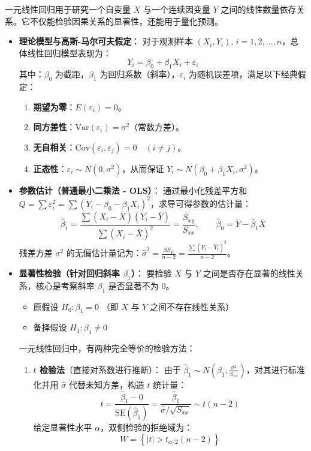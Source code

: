 \documentclass[a4paper]{ctexart}
\begin{document}
一元线性回归用于研究一个自变量 $X$ 与一个连续因变量 $Y$ 之间的线性数量依存关系。它不仅能检验因果关系的显著性，还能用于量化预测。

\begin{itemize}
    \item \textbf{理论模型与高斯-马尔可夫假定}：
    对于观测样本 $(X_i, Y_i), \, i=1,2,\dots,n$，总体线性回归模型表现为：
    \[ Y_i = \beta_0 + \beta_1 X_i + \varepsilon_i \]
    其中：$\beta_0$ 为截距，$\beta_1$ 为回归系数（斜率），$\varepsilon_i$ 为随机误差项，满足以下经典假定：
    \begin{enumerate}
        \item \textbf{期望为零}：$E(\varepsilon_i) = 0$。
        \item \textbf{同方差性}：$\text{Var}(\varepsilon_i) = \sigma^2$（常数方差）。
        \item \textbf{无自相关}：$\text{Cov}(\varepsilon_i, \varepsilon_j) = 0 \quad (i \neq j)$。
        \item \textbf{正态性}：$\varepsilon_i \sim N(0, \sigma^2)$，从而保证 $Y_i \sim N(\beta_0 + \beta_1 X_i, \sigma^2)$。
    \end{enumerate}

    \item \textbf{参数估计（普通最小二乘法 - OLS）}：
    通过最小化残差平方和 $Q = \sum \varepsilon_i^2 = \sum (Y_i - \beta_0 - \beta_1 X_i)^2$，求导可得参数的估计量：
    \[ \hat{\beta}_1 = \frac{\sum (X_i - \bar{X})(Y_i - \bar{Y})}{\sum (X_i - \bar{X})^2} = \frac{S_{xy}}{S_{xx}}, \qquad \hat{\beta}_0 = \bar{Y} - \hat{\beta}_1 \bar{X} \]
    残差方差 $\sigma^2$ 的无偏估计量记为：$\hat{\sigma}^2 = \frac{SS_E}{n - 2} = \frac{\sum (Y_i - \hat{Y}_i)^2}{n - 2}$。

    \item \textbf{显著性检验（针对回归斜率 $\beta_1$）}：
    要检验 $X$ 与 $Y$ 之间是否存在显著的线性关系，核心是考察斜率 $\beta_1$ 是否显著不为 0。
    \begin{itemize}
        \item 原假设 $H_0: \beta_1 = 0$ （即 $X$ 与 $Y$ 之间不存在线性关系）
        \item 备择假设 $H_1: \beta_1 \neq 0$
    \end{itemize}

    一元线性回归中，有两种完全等价的检验方法：
    
    \begin{enumerate}
        \item \textbf{$t$ 检验法}（直接对系数进行推断）：
        由于 $\hat{\beta}_1 \sim N\left(\beta_1, \frac{\sigma^2}{S_{xx}}\right)$，对其进行标准化并用 $\hat{\sigma}$ 代替未知方差，构造 $t$ 统计量：
        \[ t = \frac{\hat{\beta}_1 - 0}{\text{SE}(\hat{\beta}_1)} = \frac{\hat{\beta}_1}{\hat{\sigma} / \sqrt{S_{xx}}} \sim t(n - 2) \]
        给定显著性水平 $\alpha$，双侧检验的拒绝域为：
        \[ W = \left\{ |t| > t_{\alpha/2}(n - 2) \right\} \]
        

\end{enumerate}
\end{itemize}
\end{document}
